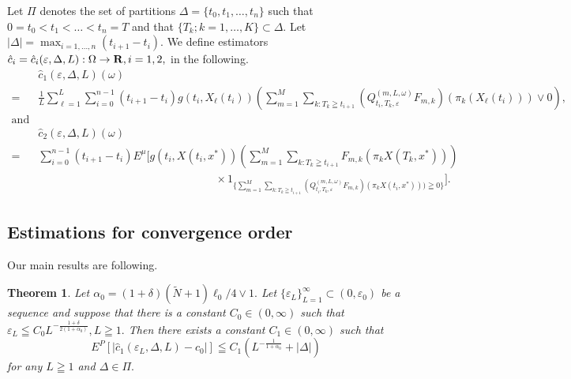 \documentclass[12pt]{article}
\newtheorem{theorem}[thm]{Theorem}
\begin{document}
Let $\Pi$ denotes the set of partitions $\Delta=\{t_0,t_1,\ldots, t_n\}$ such that 
$0=t_0 < t_1 < \ldots < t_n= T$ and that   
$\{T_k; k=1,\ldots,K\} \subset \Delta.$
Let $|\Delta|=\max_{i=1,\ldots,n}{(t_{i+1}-t_i)}.$
We define estimators $\hat{c}_i=\hat{c}_i(\varepsilon,\Delta, L) : \Omega \to {\bf R}, i=1,2,$ in the following.
\begin{align}
&\hat{c}_1(\varepsilon, \Delta, L)(\omega) \nonumber\\
=&\frac{1}{L} \sum_{\ell=1}^L \sum_{i=0}^{n-1} (t_{i+1}-t_i) g(t_i,X_{\ell}(t_i))
(\sum_{m=1}^M \sum_{k:T_k\geqq t_{i+1}} (Q_{t_i,T_k,\varepsilon}^{(m,L,\omega)}F_{m,k})(\pi_k(X_{\ell}(t_i)))\vee0), \label{app1}\\
\text{and}\nonumber \\
&\hat{c}_2(\varepsilon, \Delta, L)(\omega)\nonumber\\
=&\sum_{i=0}^{n-1}(t_{i+1}-t_{i}) E^{\mu}[g(t_i,X(t_i, x^*)) ( \sum_{m=1}^M \sum_{k:T_k\geqq t_{i+1}} F_{m,k}(\pi_k X(T_k, x^*))) \nonumber \\
& \qquad \qquad \qquad \qquad \qquad \qquad \qquad \qquad \times 1_{\{\sum_{m=1}^M \sum_{k:T_k\geqq t_{i+1}} (Q_{t_i,T_k,\varepsilon}^{(m,L,\omega)}F_{m,k})(\pi_k X(t_i,x^*))) \geqq 0\}}]. \label{app2}
\end{align}

\subsection{Estimations for convergence order}
Our main results are following.
\begin{theorem} \label{main2}
Let $\alpha_0 = (1+\delta)(\tilde{N}+1)\ell_0/4 \vee 1.$ Let $\{\varepsilon_L\}_{L = 1}^{\infty} \subset (0, \varepsilon_0)$ be a sequence and suppose
 that there is a constant $C_0 \in (0, \infty)$ such that $ \varepsilon_L \leqq C_0 L^{-\frac{1+ \delta}{2(1+\alpha_0)}}, L\geqq 1.$
 Then there exists a constant $C_1 \in (0,\infty)$ such that
$$
E^P[|\hat{c}_1(\varepsilon_L, \Delta, L)-c_{0}|] \leqq C_1 (L^{-\frac{1}{1+\alpha_0}}+|\Delta|)
$$
for any $L \geqq 1$ and $\Delta \in \Pi.$
\end{theorem}
\end{document}
